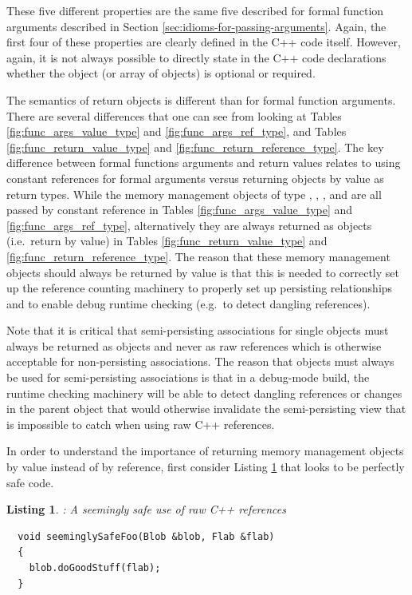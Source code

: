 \documentclass[pdf,ps2pdf,11pt]{SANDreport}
\newtheorem{listing}{Listing}
\begin{document}
These five different properties are the same five described for formal
function arguments described in Section
{}\ref{sec:idioms-for-passing-arguments}.  Again, the first four of
these properties are clearly defined in the C++ code itself.  However,
again, it is not always possible to directly state in the C++ code
declarations whether the object (or array of objects) is optional or
required.

The semantics of return objects is different than for formal function
arguments.  There are several differences that one can see from
looking at Tables {}\ref{fig:func_args_value_type} and
{}\ref{fig:func_args_ref_type}, and Tables
{}\ref{fig:func_return_value_type} and
{}\ref{fig:func_return_reference_type}.  The key difference between
formal functions arguments and return values relates to using constant
references for formal arguments versus returning objects by value as
return types.  While the memory management objects of type
{}, {}, {}, and {} are
all passed by constant reference in Tables
{}\ref{fig:func_args_value_type} and {}\ref{fig:func_args_ref_type},
alternatively they are always returned as objects (i.e.\ return by
value) in Tables {}\ref{fig:func_return_value_type} and
{}\ref{fig:func_return_reference_type}.  The reason that these memory
management objects should always be returned by value is that this is
needed to correctly set up the reference counting machinery to
properly set up persisting relationships and to enable debug runtime
checking (e.g.\ to detect dangling references).

Note that it is critical that semi-persisting associations for single
objects must always be returned as {} objects and never as
raw references {} which is otherwise acceptable for
non-persisting associations.  The reason that {} objects
must always be used for semi-persisting associations is that in a
debug-mode build, the runtime checking machinery will be able to
detect dangling references or changes in the parent object that would
otherwise invalidate the semi-persisting view that is impossible to
catch when using raw C++ references.

In order to understand the importance of returning memory management
objects by value instead of by reference, first consider Listing
{}\ref{listing:unsafe_raw_C++_reference1} that looks to be perfectly
safe code.


{}\begin{listing}: A seemingly safe use of raw C++ references
\label{listing:unsafe_raw_C++_reference1}
{\small\begin{verbatim}
  void seeminglySafeFoo(Blob &blob, Flab &flab)
  {
    blob.doGoodStuff(flab);
  }
\end{verbatim}}
\end{listing}
\end{document}
